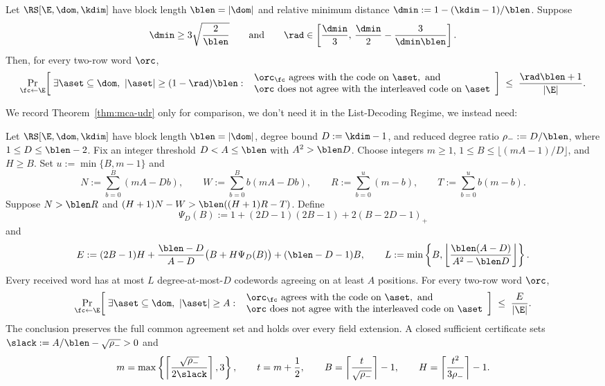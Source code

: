\begin{theorem}\label{thm:mca-udr}
Let $\RS[\E,\dom,\kdim]$ have block length $\blen = |\dom|$ and relative minimum distance $\dmin := 1 - (\kdim-1)/\blen$. Suppose
\[
\dmin \ge 3\sqrt{\frac{2}{\blen}}
\qquad\text{and}\qquad
\rad \in \left[\frac{\dmin}{3},\,\frac{\dmin}{2} - \frac{3}{\dmin \blen}\right].
\]
Then, for every two-row word $\orc$,
\[
\Pr_{\fc \leftarrow \E}\!\left[\; \exists \aset \subseteq \dom,\ |\aset| \ge (1-\rad) \blen :\ \begin{array}{l} \orc_\fc \text{ agrees with the code on } \aset, \text{ and} \\ \orc \text{ does not agree with the interleaved code on } \aset \end{array} \right]
\;\le\; \frac{\rad \blen + 1}{|\E|}.
\]
\end{theorem}

We record Theorem~\ref{thm:mca-udr} only for comparison, we don't need it in the List-Decoding Regime, we instead need:

\begin{theorem}\label{thm:mca-johnson}
Let $\RS[\E,\dom,\kdim]$ have block length $\blen=|\dom|$, degree bound $D:=\kdim-1$, and reduced degree ratio $\rho_-:=D/\blen$, where $1\le D\le\blen-2$. Fix an integer threshold $D<A\le\blen$ with $A^2>\blen D$. Choose integers $m\ge1$, $1\le B\le\lfloor(mA-1)/D\rfloor$, and $H\ge B$. Set $u:=\min\{B,m-1\}$ and
\[
 N:=\sum_{b=0}^{B}(mA-Db),\qquad W:=\sum_{b=0}^{B}b(mA-Db),\qquad R:=\sum_{b=0}^{u}(m-b),\qquad T:=\sum_{b=0}^{u}b(m-b).
\]
Suppose $N>\blen R$ and $(H+1)N-W>\blen((H+1)R-T)$. Define
\[
 \Psi_D(B):=1+(2D-1)(2B-1)+2(B-2D-1)_+
\]
and
\[
 E:=(2B-1)H+\frac{\blen-D}{A-D}\bigl(B+H\Psi_D(B)\bigr)+(\blen-D-1)B,
 \qquad
 L:=\min\left\{B,\left\lfloor\frac{\blen(A-D)}{A^2-\blen D}\right\rfloor\right\}.
\]
Every received word has at most $L$ degree-at-most-$D$ codewords agreeing on at least $A$ positions. For every two-row word $\orc$,
\[
\Pr_{\fc \leftarrow \E}\!\left[\; \exists \aset \subseteq \dom,\ |\aset| \ge A :\ \begin{array}{l} \orc_\fc \text{ agrees with the code on } \aset, \text{ and} \\ \orc \text{ does not agree with the interleaved code on } \aset \end{array} \right] \;\le\; \frac{E}{|\E|}.
\]
The conclusion preserves the full common agreement set and holds over every field extension. A closed sufficient certificate sets $\slack:=A/\blen-\sqrt{\rho_-}>0$ and
\[
 m=\max\left\{\left\lceil\frac{\sqrt{\rho_-}}{2\slack}\right\rceil,3\right\},\qquad t=m+\frac12,\qquad B=\left\lceil\frac{t}{\sqrt{\rho_-}}\right\rceil-1,\qquad H=\left\lceil\frac{t^2}{3\rho_-}\right\rceil-1.
\]
\end{theorem}

